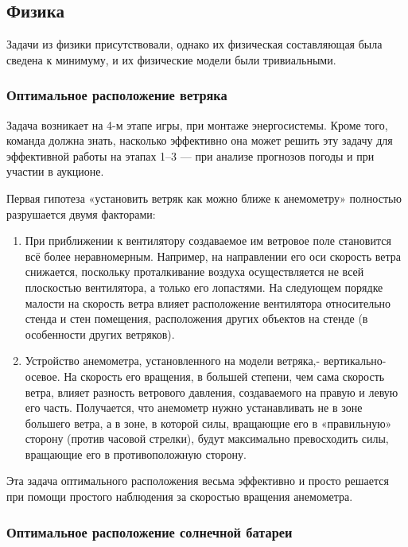 \subsection*{Физика}

Задачи из физики присутствовали, однако их физическая составляющая была сведена к минимуму, и их физические модели были тривиальными.

\subsubsection*{Оптимальное расположение ветряка}

Задача возникает на 4-м этапе игры, при монтаже энергосистемы. Кроме того, команда должна знать, насколько эффективно она может решить эту задачу для эффективной работы на этапах 1–3 — при анализе прогнозов погоды и при участии в аукционе.

Первая гипотеза «установить ветряк как можно ближе к анемометру» полностью разрушается двумя факторами:

\begin{enumerate}
    \item При приближении к вентилятору создаваемое им ветровое поле становится всё более неравномерным. Например, на направлении его оси скорость ветра снижается, поскольку проталкивание воздуха осуществляется не всей плоскостью вентилятора, а только его лопастями. На следующем порядке малости на скорость ветра влияет расположение вентилятора относительно стенда и стен помещения, расположения других объектов на стенде (в особенности других ветряков).
    \item Устройство анемометра, установленного на модели ветряка,- вертикально-осевое. На скорость его вращения, в большей степени, чем сама скорость ветра, влияет разность ветрового давления, создаваемого на правую и левую его часть. Получается, что анемометр нужно устанавливать не в зоне большего ветра, а в зоне, в которой силы, вращающие его в «правильную» сторону (против часовой стрелки), будут максимально превосходить силы, вращающие его в противоположную сторону.
\end{enumerate}

Эта задача оптимального расположения весьма эффективно и просто решается при помощи простого наблюдения за скоростью вращения анемометра.

\subsubsection*{Оптимальное расположение солнечной батареи}

